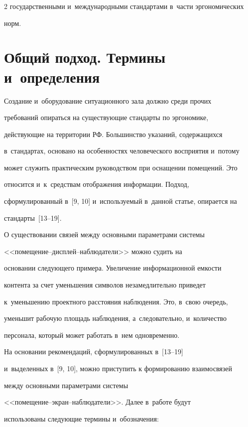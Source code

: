 \begin{multicols}{2}
государственными и~международными стандартами в~части эргономических

норм.



\section{Общий подход. Термины и~определения}



	Создание и~оборудование ситуационного зала должно среди прочих

требований опираться на существующие стандарты по эргономике,

действующие на территории РФ. Большинство указаний, содержащихся

в~стандартах, основано на особенностях человеческого восприятия и~потому

может служить практическим руководством при оснащении помещений. Это

относится и~к~средствам отображения информации. Подход,

сформулированный в~[9, 10] и~используемый в~данной статье, опирается на

стандарты~[13--19].



    О существовании связей между основными параметрами системы

    <<по\-ме\-ще\-ние--дис\-плей--на\-блю\-да\-те\-ли>> можно судить на

основании сле\-ду\-юще\-го примера. Увеличение информационной емкости

контента за счет уменьшения символов незамедлительно приведет

к~уменьшению проектного расстояния наблюдения. Это, в~свою очередь,

уменьшит рабочую площадь наблюдения, а~следовательно, и~количество

персонала, который может работать в~нем одновременно.



	На основании рекомендаций, сформулированных в~[13--19]

и~выделенных в~[9, 10], можно при\-ступить к формированию взаимосвязей

между основны\-ми параметрами системы

<<по\-ме\-ще\-ние--экран--на\-блю\-да\-те\-ли>>. Далее в~работе будут

использованы следующие термины и~обозначения:


\end{multicols}

